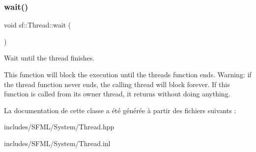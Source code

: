 \subsubsection{\texorpdfstring{wait()}{wait()}}
{\footnotesize\ttfamily void sf\+::\+Thread\+::wait (\begin{DoxyParamCaption}{ }\end{DoxyParamCaption})}



Wait until the thread finishes. 

This function will block the execution until the thread\textquotesingle{}s function ends. Warning\+: if the thread function never ends, the calling thread will block forever. If this function is called from its owner thread, it returns without doing anything. 

La documentation de cette classe a été générée à partir des fichiers suivants \+:\begin{DoxyCompactItemize}
\item 
includes/\+S\+F\+M\+L/\+System/Thread.\+hpp\item 
includes/\+S\+F\+M\+L/\+System/Thread.\+inl\end{DoxyCompactItemize}
